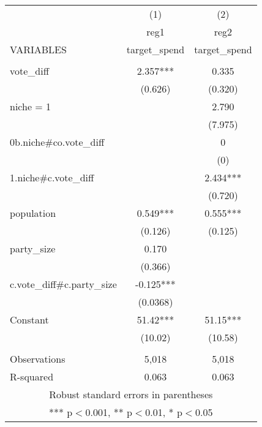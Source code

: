 \documentclass[]{article}
\begin{document}
\begin{tabular}{lcc} \hline
 & (1) & (2) \\
 & reg1 & reg2 \\
VARIABLES & target\_spend & target\_spend \\ \hline
 &  &  \\
vote\_diff & 2.357*** & 0.335 \\
 & (0.626) & (0.320) \\
niche = 1 &  & 2.790 \\
 &  & (7.975) \\
0b.niche\#co.vote\_diff &  & 0 \\
 &  & (0) \\
1.niche\#c.vote\_diff &  & 2.434*** \\
 &  & (0.720) \\
population & 0.549*** & 0.555*** \\
 & (0.126) & (0.125) \\
party\_size & 0.170 &  \\
 & (0.366) &  \\
c.vote\_diff\#c.party\_size & -0.125*** &  \\
 & (0.0368) &  \\
Constant & 51.42*** & 51.15*** \\
 & (10.02) & (10.58) \\
 &  &  \\
Observations & 5,018 & 5,018 \\
 R-squared & 0.063 & 0.063 \\ \hline
\multicolumn{3}{c}{ Robust standard errors in parentheses} \\
\multicolumn{3}{c}{ *** p$<$0.001, ** p$<$0.01, * p$<$0.05} \\
\end{tabular}
\end{document}

